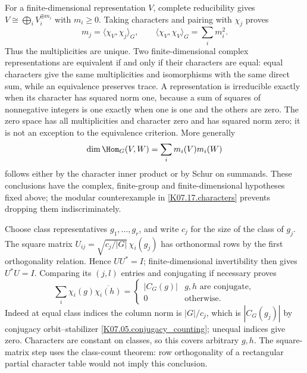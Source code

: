 For a finite-dimensional representation $V$, complete reducibility
gives $V\cong\bigoplus_i V_i^{\oplus m_i}$ with $m_i\geq0$.
Taking characters and pairing with $\chi_j$ proves
\[
 m_j=\langle\chi_V,\chi_j\rangle_G,
 \qquad \langle\chi_V,\chi_V\rangle_G=\sum_i m_i^2.
\]
Thus the multiplicities are unique. Two finite-dimensional complex
representations are equivalent if and only if their characters are equal:
equal characters give the same multiplicities and isomorphisms with the
same direct sum, while an equivalence preserves trace. A representation
is irreducible exactly when its character has squared norm one, because
a sum of squares of nonnegative integers is one exactly when one is
one and the others are zero. The zero space has all multiplicities and
character zero and has squared norm zero; it is not an exception to the
equivalence criterion. More generally
\[
 \dim\Hom_G(V,W)=\sum_i m_i(V)m_i(W)
\]
follows either by the character inner product or by Schur on summands.
These conclusions have the complex, finite-group and finite-dimensional
hypotheses fixed above; the modular counterexample in
\ref{K07.17.characters} prevents dropping them indiscriminately.

Choose class representatives $g_1,\ldots,g_r$, and write $c_j$ for
the size of the class of $g_j$. The square matrix
$U_{ij}=\sqrt{c_j/|G|}\,\chi_i(g_j)$ has orthonormal rows by the
first orthogonality relation. Hence $UU^*=I$; finite-dimensional
invertibility then gives $U^*U=I$. Comparing its $(j,l)$ entries and
conjugating if necessary proves
\[
 \sum_i\chi_i(g)\overline{\chi_i(h)}
 =\begin{cases}|C_G(g)|&g,h\text{ are conjugate},\\0&\text{otherwise}.
 \end{cases}
\]
Indeed at equal class indices the column norm is $|G|/c_j$, which is
$|C_G(g_j)|$ by conjugacy orbit--stabilizer
\ref{K07.05.conjugacy_counting}; unequal indices give zero.
Characters are constant on classes, so this covers arbitrary $g,h$.
The square-matrix step uses the class-count theorem: row orthogonality
of a rectangular partial character table would not imply this conclusion.

